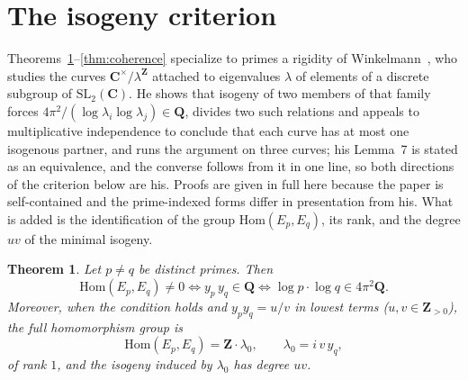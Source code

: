 \documentclass[11pt]{article}
\newtheorem{theorem}{Theorem}
\theoremstyle{definition}
\theoremstyle{remark}
\newcommand{\Z}{\mathbf{Z}}
\newcommand{\Q}{\mathbf{Q}}
\newcommand{\C}{\mathbf{C}}
\newcommand{\Hom}{\mathrm{Hom}}
\begin{document}
\section{The isogeny criterion}
\label{sec:isogeny}

Theorems~\ref{thm:isogeny}--\ref{thm:coherence} specialize to primes a
rigidity of Winkelmann~\cite[Lemma~7 and the proof of Thm.~2, p.~16]{Wi04},
who studies the curves $\C^\times/\lambda^{\Z}$ attached to eigenvalues
$\lambda$ of elements of a discrete subgroup of $\mathrm{SL}_2(\C)$. He shows
that isogeny of two members of that family forces
$4\pi^2/(\log\lambda_i \log\lambda_j) \in \Q$, divides two such relations and
appeals to multiplicative independence to conclude that each curve has at most
one isogenous partner, and runs the argument on three curves; his Lemma~7 is
stated as an equivalence, and the converse follows from it in one line, so
both directions of the criterion below are his. Proofs are given in full here
because the paper is self-contained and the prime-indexed forms differ in
presentation from his. What is added is the identification of the group
$\Hom(E_p, E_q)$, its rank, and the degree $uv$ of the minimal isogeny.

\begin{theorem}
\label{thm:isogeny}
Let $p \neq q$ be distinct primes. Then
\[
\Hom(E_p, E_q) \neq 0
\iff y_p\, y_q \in \Q
\iff \log p \cdot \log q \in 4\pi^2\Q .
\]
Moreover, when the condition holds and $y_p y_q = u/v$ in lowest terms
($u, v \in \Z_{>0}$), the full homomorphism group is
\[
\Hom(E_p, E_q) = \Z\cdot\lambda_0 , \qquad \lambda_0 = i\, v\, y_q ,
\]
of rank $1$, and the isogeny induced by $\lambda_0$ has degree $uv$.
\end{theorem}
\end{document}
